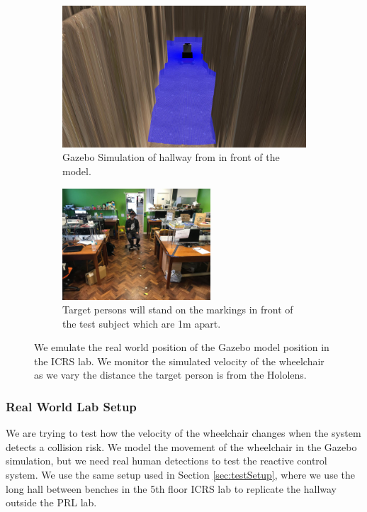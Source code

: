\begin{figure}[ht!]
	\begin{subfigure}[b]{.48\textwidth}
		\centering
		\includegraphics[width=1.0\linewidth]{img/chapter6_test/gazeboFront.jpg}
		\caption{Gazebo Simulation of hallway from in front of the model.}
	\end{subfigure}%
	\hspace{\fill} 
	\begin{subfigure}[b]{.48\textwidth}
		\centering
		\includegraphics[width=1.0\linewidth,height=41.5mm]{img/chapter6_test/realFront.jpg}
		\caption{Target persons will stand on the markings in front of the test subject which are 1m apart.}
	\end{subfigure}
	\vspace{-1\baselineskip}
	\begin{center}
		\caption{We emulate the real world position of the Gazebo model position in the ICRS lab. We monitor the simulated velocity of the wheelchair as we vary the distance the target person is from the Hololens.}
		\label{fig:greenredrender}
	\end{center}
	\vspace{-2\baselineskip}
\end{figure}

\subsubsection{Real World Lab Setup}
We are trying to test how the velocity of the wheelchair changes when the system detects a collision risk. We model the movement of the wheelchair in the Gazebo simulation, but we need real human detections to test the reactive control system. We use the same setup used in Section \ref{sec:testSetup}, where we use the long hall between benches in the 5th floor ICRS lab to replicate the hallway outside the PRL lab.

